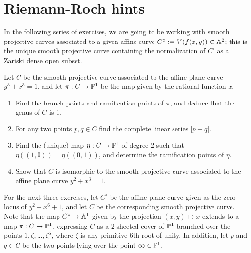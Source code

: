 

\chapter{Riemann-Roch hints}\label{Inflections hints}

In the following series of exercises, we are going to be working with smooth projective curves associated to a given affine curve $C^\circ := V(f(x,y)) \subset \AA^2$; this is the unique smooth projective curve containing the normalization of $C^\circ$ as a Zariski dense open subset.

\begin{exercise}
Let $C$ be the smooth projective curve associated to the affine plane curve $y^3 +x^3 = 1$, and let $\pi : C \to \PP^1$ be the map given by the rational function $x$.
\begin{enumerate}
\item Find the branch points and ramification points of $\pi$, and deduce that the genus of $C$ is 1.
\item For any two points $p, q \in C$ find the complete linear series $|p+q|$.
\item Find the (unique) map $\eta : C \to \PP^1$ of degree 2 such that $\eta((1,0)) = \eta((0,1))$, and determine the ramification points of $\eta$.
\item Show that $C$ is isomorphic to the smooth projective curve associated to the affine plane curve $y^2 +x^3 = 1$.
\end{enumerate}
\end{exercise}

For the next three exercises, let $C^\circ$ be the affine plane curve given as the zero locus of $y^2 - x^6 +1$, and let $C$ be the corresponding smooth projective curve. Note that the map $C^\circ \to \AA^1$ given by the projection $(x,y) \mapsto x$ extends to a map $\pi : C \to \PP^1$, expressing $C$ as a 2-sheeted cover of $\PP^1$ branched over the points $1, \zeta, \dots, \zeta^5$, where $\zeta$ is any primitive 6th root of unity. In addition, let $p$ and $q \in C$ be the two points lying over the point $\infty \in \PP^1$.

